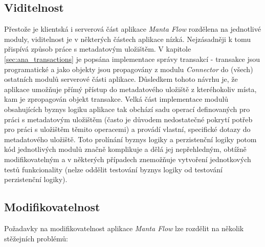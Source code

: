 \subsection{Viditelnost}
\label{sec:ana_visibility}
Přestože je klientská i serverová část aplikace \textit{Manta Flow} rozdělena na jednotlivé moduly, viditelnost je v některých částech aplikace nízká. Nejzásadněji k tomu přispívá způsob práce s metadatovým uložištěm. V kapitole \ref{sec:ana_transactions} je popsána implementace správy transakcí - transakce jsou programatické a jako objekty jsou propagovány z modulu \textit{Connector} do (všech) ostatních modulů serverové části aplikace. Důsledkem tohoto návrhu je, že aplikace umožňuje přímý přístup do metadatového uložiště z kteréhokoliv místa, kam je zpropagován objekt transakce. Velká část implementace modulů obsahujících byznys logiku aplikace tak obchází sadu operací definovaných pro práci s metadatovým uložištěm (často je důvodem nedostatečné pokrytí potřeb pro práci s uložištěm těmito operacemi) a provádí vlastní, specifické dotazy do metadatového uložiště. Toto prolínání byznys logiky a perzistenční logiky potom kód jednotlivých modulů značně komplikuje a dělá jej nepřehledným, obtížně modifikovatelným a v některých případech znemožňuje vytvoření jednotkových testů funkcionality (nelze oddělit testování byznys logiky od testování perzistenční logiky).


\subsection{Modifikovatelnost}
\label{sec:ana_modularity}
Požadavky na modifikovatelnost aplikace \textit{Manta Flow} lze rozdělit na několik stěžejních problémů:

